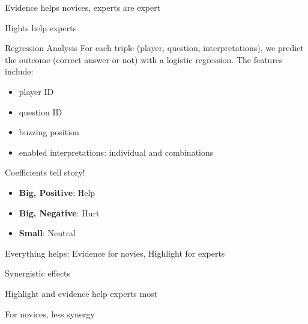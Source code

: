 \documentclass[compress]{beamer}
\newcommand{\fsi}[2]{
\begin{frame}[plain]
\vspace*{-1pt}
\makebox[\linewidth]{\texttt{[image: \#1]}}
\begin{center}
#2
\end{center}
\end{frame}
}
\begin{document}
\fsi{qb/augment/tools_acc}{Evidence helps novices, experts are expert}
\fsi{qb/augment/tools_buzz}{Hights help experts}

\begin{frame}{Regression Analysis}
    For each triple (player, question, interpretations), we predict the outcome
    (correct answer or not) with a logistic regression. The features include:
    \begin{itemize}
        \item player ID
        \item question ID
        \item buzzing position
        \item enabled interpretations: individual and combinations
    \end{itemize}

    \pause

    \begin{block}{Coefficients tell story!}
      \begin{itemize}
        \item {\bf Big, Positive}: Help
        \item {\bf Big, Negative}: Hurt
        \item {\bf Small}: Neutral
      \end{itemize}
    \end{block}

\end{frame}


\fsi{qb/augment/coefs_0}{Everything helps: Evidence for novies,
  Highlight for experts}
\fsi{qb/augment/coefs_1}{Synergistic effects}
\fsi{qb/augment/coefs_2}{Highlight and evidence help experts most}
\fsi{qb/augment/coefs_3}{For novices, less synergy}
\end{document}
